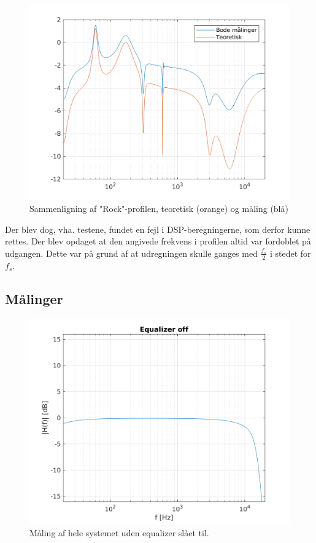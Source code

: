 \begin{figure}[h!]
	\centering
	\includegraphics[width=15cm]{billeder/rock_test}
	\caption{Sammenligning af "Rock"-profilen, teoretisk (orange) og måling (blå)}
	\label{fig:rock_test}
\end{figure}

Der blev dog, vha. testene, fundet en fejl i DSP-beregningerne, som derfor kunne rettes. Der blev opdaget at den angivede frekvens i profilen altid var fordoblet på udgangen. Dette var på grund af at udregningen skulle ganges med $\frac{f_s}{2}$ i stedet for $f_s$.

\subsection{Målinger}

\begin{figure}[h]
\centering
\includegraphics[]{matlabdemo/test/eq_off.png}  
\caption{Måling af hele systemet uden equalizer slået til.}
\end{figure}


